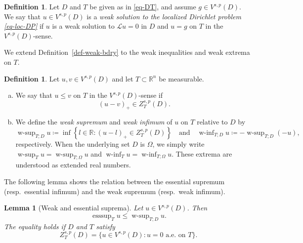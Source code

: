 \documentclass[11pt]{amsart}
\theoremstyle{plain}
\newtheorem{lemma}[theorem]{Lemma}
\theoremstyle{definition}
\newtheorem{definition}[theorem]{Definition}
\numberwithin{equation}{section}
\DeclareMathOperator*{\esssup}{esssup}
\DeclareMathOperator*{\wsup}{w-sup}
\DeclareMathOperator*{\winf}{w-inf}
\begin{document}
\begin{definition}\label{def-weak-DP}
Let $D$ and $T$ be given as in \eqref{eq-DT}, and assume $g \in V^{s, p}(D)$. We say that $u \in V^{s, p}(D)$ is a \emph{weak solution to the localized Dirichlet problem \eqref{eq-loc-DP}} if $u$ is a weak solution to $\mathcal{L}u=0$ in $D$ and $u=g$ on $T$ in the $V^{s, p}(D)$-sense.
\end{definition}

We extend Definition~\ref{def-weak-bdry} to the weak inequalities and weak extrema on $T$.

\begin{definition}
Let $u, v \in V^{s, p}(D)$ and let $T \subset \mathbb{R}^n$ be measurable.
\begin{enumerate}[(a)]
\item
We say that $u \leq v$ on $T$ in the $V^{s, p}(D)$-sense if
\begin{equation*}
(u-v)_+ \in Z^{s, p}_T(D).
\end{equation*}
\item
We define the \emph{weak supremum} and \emph{weak infimum} of $u$ on $T$ relative to $D$ by
\begin{equation*}
\wsup_{T; D} u \coloneqq \inf {\left\{ l \in \mathbb{R}: (u-l)_+ \in Z^{s, p}_T(D) \right\}} \quad\text{and}\quad \winf_{T; D} u \coloneqq - \wsup_{T; D} {(-u)},
\end{equation*}
respectively. When the underlying set $D$ is $\Omega$, we simply write $\wsup_T u = \wsup_{T; \Omega} u$ and $\winf_T u = \winf_{T; \Omega} u$. These extrema are understood as extended real numbers. 
\end{enumerate}
\end{definition}



The following lemma shows the relation between the essential supremum (resp.\ essential infimum) and the weak supremum (resp.\ weak infimum).

\begin{lemma}[Weak and essential suprema]\label{lem-wsup-esssup}
Let $u \in V^{s, p}(D)$. Then
\begin{equation}\label{eq-esssup-wsup}
\esssup_{T}{u} \leq \wsup_{T; D}{u}.
\end{equation}
The equality holds if $D$ and $T$ satisfy
\begin{equation}\label{eq-density}
Z^{s, p}_T(D) = \{u \in V^{s, p}(D): u=0 \text{ a.e.\ on }T\}.
\end{equation}
\end{lemma}
\end{document}
